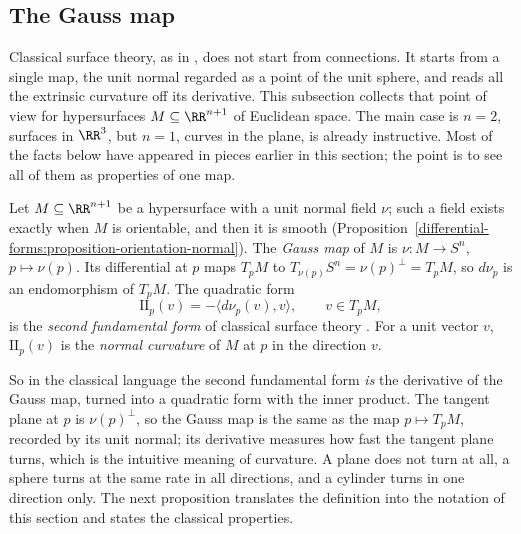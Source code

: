 \subsection{The Gauss map}\label{riemannian-geometry:subsection-gauss-map}

Classical surface theory, as in \cite[Chapter 3]{do-carmo-curves-surfaces}, does not start from connections. It starts from a single map, the unit normal regarded as a point of the unit sphere, and
reads all the extrinsic curvature off its derivative. This subsection collects that point of view for hypersurfaces $M \subseteq \RR^{n+1}$ of Euclidean space. The main case is $n = 2$, surfaces in $\RR^3$,
but $n = 1$, curves in the plane, is already instructive. Most of the facts below have appeared in pieces earlier in this section; the point is to see all of them as properties of one map.

\begin{definition}\label{riemannian-geometry:definition-gauss-map}
Let $M \subseteq \RR^{n+1}$ be a hypersurface with a unit normal field $\nu$; such a field exists exactly when $M$ is orientable, and then it is smooth
(Proposition~\ref{differential-forms:proposition-orientation-normal}). The \emph{Gauss map} of $M$ is $\nu \colon M \to S^n$, $p \mapsto \nu(p)$. Its differential at $p$ maps $T_pM$ to
$T_{\nu(p)}S^n = \nu(p)^\perp = T_pM$, so $d\nu_p$ is an endomorphism of $T_pM$. The quadratic form
\[
\mathrm{II}_p(v) = -\langle d\nu_p(v), v\rangle, \qquad v \in T_pM,
\]
is the \emph{second fundamental form} of classical surface theory \cite[Section 3-2]{do-carmo-curves-surfaces}. For a unit vector $v$, $\mathrm{II}_p(v)$ is the \emph{normal curvature} of $M$ at $p$ in the
direction $v$.
\end{definition}

So in the classical language the second fundamental form \emph{is} the derivative of the Gauss map, turned into a quadratic form with the inner product. The tangent plane at $p$ is $\nu(p)^\perp$, so the
Gauss map is the same as the map $p \mapsto T_pM$, recorded by its unit normal; its derivative measures how fast the tangent plane turns, which is the intuitive meaning of curvature. A plane does not turn at
all, a sphere turns at the same rate in all directions, and a cylinder turns in one direction only. The next proposition translates the definition into the notation of this section and states the
classical properties.

